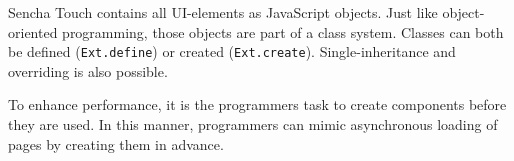 \documentclass[a4paper]{artikel3}
\newcommand{\code}[1]{\texttt{#1}}
\renewcommand{\paragraph}[1]{{\bf #1} }
\begin{document}

Sencha Touch contains all UI-elements as JavaScript objects.  Just like object-oriented programming,  those objects are part of a class system.  Classes can both be defined (\code{Ext.define}) or created (\code{Ext.create}).  Single-inheritance and overriding is also possible.    

To enhance performance,  it is the programmers task to create components before they are used.  In this manner,  programmers can mimic asynchronous loading of pages by creating them in advance.

% 
% 
\end{document}
